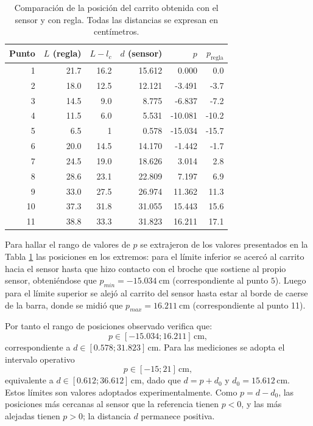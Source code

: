 \documentclass[a4paper, twoside, 10pt, spanish]{article}
\numberwithin{table}{section}
\begin{document}
    \begin{table}[H]
        \centering
        \caption{Comparación de la posición del carrito obtenida con el sensor y con regla. Todas las distancias se expresan en centímetros.}
        \label{tab:medicion_carrito}
        \small
        \begin{tabular}{rrrrrr}
            \toprule
            Punto & $L$ (regla) & $L-l_c$ & $d$ (sensor) & $p$ & $p_{\text{regla}}$ \\
            \midrule
            1  & 21.7 & 16.2 & 15.612 & 0.000   & 0.0 \\
            2  & 18.0 & 12.5 & 12.121 & -3.491  & -3.7 \\
            3  & 14.5 & 9.0  & 8.775  & -6.837  & -7.2 \\
            4  & 11.5 & 6.0  & 5.531  & -10.081 & -10.2 \\
            5  & 6.5  & 1  & 0.578  & -15.034  & -15.7 \\
            6  & 20.0 & 14.5 & 14.170 & -1.442  & -1.7 \\
            7  & 24.5 & 19.0 & 18.626 & 3.014   & 2.8 \\
            8  & 28.6 & 23.1 & 22.809 & 7.197   & 6.9 \\
            9  & 33.0 & 27.5 & 26.974 & 11.362  & 11.3 \\
            10 & 37.3 & 31.8 & 31.055 & 15.443  & 15.6 \\
            11 & 38.8 & 33.3 & 31.823 & 16.211  & 17.1 \\
            \bottomrule
        \end{tabular}
    \end{table}

    Para hallar el rango de valores de $p$ se extrajeron de los valores presentados en la Tabla \ref{tab:medicion_carrito} las posiciones en los extremos: para el límite inferior se acercó al carrito hacia el sensor hasta que hizo contacto con el broche que sostiene al propio sensor, obteniéndose que $p_{min} = -15.034 \ \text{cm}$ (correspondiente al punto $5$). Luego para el límite superior se alejó al carrito del sensor hasta estar al borde de caerse de la barra, donde se midió que $p_{max} = 16.211 \ \text{cm}$ (correspondiente al punto 11).

    Por tanto el rango de posiciones observado verifica que:
    \[
        p\in[-15.034;16.211]\,\text{cm},
    \]
    correspondiente a $d\in[0.578; 31.823]\,\text{cm}$.
    Para las mediciones se adopta el intervalo operativo
    \[
        p\in[-15;21]\,\text{cm},
    \]
    equivalente a $d\in[0.612;36.612]\,\text{cm}$, dado que $d=p+d_0$ y $d_0=15.612\,\text{cm}$. Estos límites son valores adoptados experimentalmente.
    Como $p=d-d_0$, las posiciones más cercanas al sensor que la referencia tienen $p<0$, y las más alejadas tienen $p>0$; la distancia $d$ permanece positiva.\\
\end{document}
